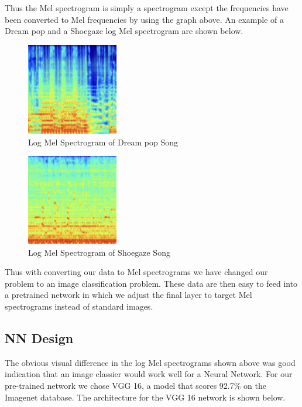\documentclass[letterpaper, 12 pt, conference]{ieeeconf}  %
\begin{document}
Thus the Mel spectrogram is simply a spectrogram except the frequencies have been converted to Mel frequencies by using the graph above. An example of a Dream pop and a Shoegaze log Mel spectrogram are shown below.

\begin{figure}
\begin{center}
    \includegraphics[width=4cm]{dreampop_spectrogram.png}
\caption{Log Mel Spectrogram of Dream pop Song}
\end{center}

\end{figure}


\begin{figure}
\begin{center}
    \includegraphics[width=4cm]{shoegaze_spectrogram.png}
\caption{Log Mel Spectrogram of Shoegaze Song}
\end{center}
\end{figure}


Thus with converting our data to Mel spectrograms we have changed our problem to an image classification problem. These data are then easy to feed into a pretrained network in which we adjust the final layer to target Mel spectrograms instead of standard images. 

\subsection{NN Design}

The obvious visual difference in the log Mel spectrograms shown above was good indication that an image classier would work well for a Neural Network. For our pre-trained network we chose VGG 16, a model that scores 92.7\% on the Imagenet database. The architecture for the VGG 16 network is shown below.
\end{document}
